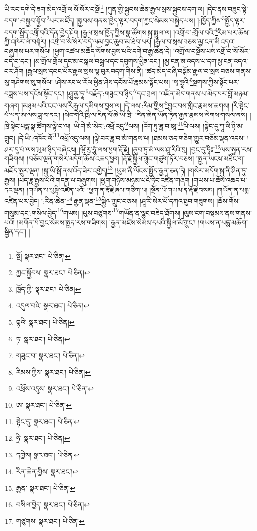 ཡི་རང་དགེ་དེ་ཟག་མེད་འགྲོ་ལ་སོ་སོར་བསྔོ།\footnote{སྔོ།  སྣར་ཐང་།  པེ་ཅིན། } །ཀུན་གྱི་སྐྱབས་ཆེན་རྒྱལ་སྲས་སྐྱབས་དག་ལ། །དེང་ནས་བཟུང་སྟེ་བདག་:བསྐྱབ་སྐྱོབ་\footnote{ཀྱང་སྐྱོབས་  སྣར་ཐང་།  པེ་ཅིན། }པར་མཛོད། །སྐྱབས་གནས་ཁྱེད་ལྟར་བདག་ཀྱང་སེམས་བསྐྱེད་པས། །:ཁྱོད་ཀྱིས་\footnote{ཁྱོད་ཀྱི་  སྣར་ཐང་།  པེ་ཅིན། }སྤྱོད་ལྟར་བདག་སྤྱོད་འགྲོ་བའི་དོན་བྱེད་ཤོག །རྒྱལ་སྲས་ཁྱོད་ཀྱིས་སྣ་ཚོགས་སྐུ་སྤྲུལ་ལ། །འགྲོ་བ་:གྲོལ་བའི་\footnote{འདུལ་བའི་  སྣར་ཐང་།  པེ་ཅིན། }རིམ་པར་ཆོས་ཀྱི་འཁོར་ལོ་བསྐོར། །འགྲོ་བ་སོ་སོར་བདེ་ལམ་བྱང་ཆུབ་མ་ཐོབ་པར། །རྒྱལ་བ་སྲས་བཅས་མྱ་ངན་མི་འདའ་བཞུགས་པར་གསོལ། །ཕྱག་འཚལ་མཆོད་སོགས་བྱས་པའི་དགེ་བ་རྒྱ་ཆེན་དེ། །འགྲོ་ལ་བསྔོས་པས་འགྲོ་བ་སོ་སོར་བདེ་བ་དང་། །མ་གྲོལ་གྲོལ་དང་མ་བསྒལ་བསྒྲལ་དང་དབུགས་ཕྱིན་དང་། །མྱ་ངན་མ་འདས་པ་དག་མྱ་ངན་འདའ་བར་ཤོག །རྒྱལ་སྲས་དབང་པོར་རྒྱལ་སྲས་ལྟ་བུར་བདག་གིས་ནི། །ཚད་མེད་བཞི་བསྒོམ་རྒྱལ་བ་སྲས་བཅས་གནས་སུ་གཤེགས་སུ་གསོལ། །ཤེས་རབ་ཕ་རོལ་ཕྱིན་ཤེས་དངོས་པོ་རྣམས་སྟོང་པས། །སྭ་བྷཱའི་\footnote{བྷའི་  སྣར་ཐང་།  པེ་ཅིན། }སྔགས་ཀྱིས་སྟོང་པར་བཟླས་པས་དངོས་སྟོང་དང་། །ཤཱུ་ནྱ་ཏཱ་\footnote{ཏ་  སྣར་ཐང་།  པེ་ཅིན། }བརྗོད་:གཟུང་བ་ཉིད་\footnote{གཟུང་བ་  སྣར་ཐང་།  པེ་ཅིན། }དང་བྲལ། །འཛིན་མེད་གནས་པ་མེད་པར་བློ་མཉམ་གཞག །མཉམ་པའི་ངང་ལས་རི་རྒྱལ་དམིགས་བྱས་ལ། །དེ་ལས་:རིམ་གྱིས་\footnote{རིམས་ཀྱིས་  སྣར་ཐང་།  པེ་ཅིན། }བྱུང་བས་གླིང་རྣམས་ཆགས། །རི་སྟེང་པཾ་པད་ཨ་ལས་ཟླ་བ་དང་། །སེང་གེའི་ཁྲི་ལ་རིན་པོ་ཆེ་ཡི་ཁྲི། །རིན་ཆེན་ཡོན་ཏན་རྒྱན་རྣམས་ལེགས་གསལ་ནས། །ཁྲི་སྟེང་པདྨ་སྣ་ཚོགས་ལྟེ་བ་ལ། །ཡི་གེ་མཾ་སེར་:འཕྲོ་འདུ་\footnote{འཕྲོས་འདུས་  སྣར་ཐང་།  པེ་ཅིན། }ལས། །འོག་ཏུ་ཟླ་བ་ཨཱ་\footnote{ཨ་  སྣར་ཐང་།  པེ་ཅིན། }ལི་ལས། །སྟེང་དུ་ཀཱ་ལི་ཉི་མ་གྲུབ། །དེ་ཡི་:འཁོར་ལོ་\footnote{སྟེང་དུ་  སྣར་ཐང་།  པེ་ཅིན། }འཕྲོ་འདུ་ལས། །ལྟེ་བར་ཟླ་བ་མཾ་གནས་པ། །ཐམས་ཅད་གཅིག་གྱུར་བཅོམ་ལྡན་འདས། །ཤར་དུ་པཾ་ལས་ཡུམ་ཉིད་བཞེངས། །ལྷོ་རུ་ཧཱུཾ་ལས་ཕྱག་རྡོ་རྗེ། །ནུབ་ཏུ་མཾ་ལས་ཤཱ་རིའི་བུ། །བྱང་དུ་ཧྲཱིཿ་\footnote{ཧྲི་  སྣར་ཐང་།  པེ་ཅིན། }ལས་སྤྱན་རས་གཟིགས། །བཅོམ་ལྡན་གསེར་མདོག་ཆོས་འཆད་ཕྱག །རྡོ་རྗེ་སྐྱིལ་ཀྲུང་གཙུག་ཏོར་བཅས། །སྤྱན་ཡངས་མཐིང་ག་མཇོད་སྤུར་ལྡན། །སྐུ་ཡི་སྒོ་ནས་འོད་ཟེར་འགྱེད།\footnote{དགྱེས།  སྣར་ཐང་།  པེ་ཅིན། } །ཡུམ་ནི་ལོངས་སྤྱོད་རྒྱན་ཅན་ཏེ། །གསེར་མདོག་སྐུ་ནི་ཤིན་ཏུ་རྒྱས། །པད་ཟླ་རྒྱས་པའི་གདན་ལ་བཞུགས། །ཕྱག་གཉིས་མཉམ་པའི་ཏིང་འཛིན་གཞག །གཡས་པ་ཆོས་འཆད་པ་དང་ལྡན། །གཡོན་པ་པུསྟི་འཛིན་པའོ། །ཕྱག་ན་རྡོ་རྗེ་ཞལ་གཅིག་པ། །སྔོན་པོ་གཡས་ན་རྡོ་རྗེ་བསམ། །གཡོན་ན་པདྨ་འཛིན་པར་བྱེད། །:རིན་ཆེན་\footnote{རིན་ཆེན་གྱིས་  སྣར་ཐང་། }:རྒྱན་ལྡན་\footnote{རྒྱན་  སྣར་ཐང་།  པེ་ཅིན། }སྐྱིལ་ཀྲུང་བཅས། །ཤཱ་རི་སེར་པོ་དཀའ་ཐུབ་གཟུགས། །ཆོས་གོས་གསུམ་དང་:གསིལ་བྱེད་\footnote{བསིལ་བྱེད་  སྣར་ཐང་།  པེ་ཅིན། }གཡས། །པུས་བཙུགས་\footnote{གཙུགས་  སྣར་ཐང་།  པེ་ཅིན། }གཡོན་ན་ལྷུང་བཟེད་ཐོགས། །ལུས་ངག་བསྡམས་ནས་གནས་པའོ། །མགོན་པོ་བྱང་སེམས་སྤྱན་རས་གཟིགས། །རྒྱན་མཛེས་སེམས་དཔའི་སྐྱིལ་མོ་ཀྲུང་། །གཡས་ན་པདྨ་མཆོག་སྦྱིན་དང་། །
